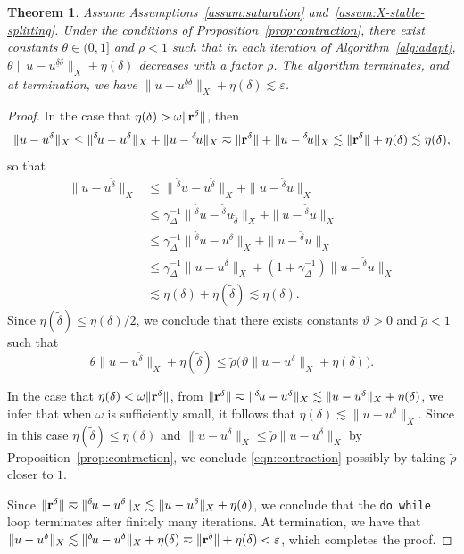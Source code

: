 \documentclass[11pt,a4paper,oneside,english]{amsart}
\numberwithin{equation}{section}
\newtheorem{theorem}{Theorem}
\numberwithin{theorem}{section}
\theoremstyle{definition}
\newcommand{\eps}{\varepsilon}
\newcommand{\udelta}{{\underline{\delta}}}
\newcommand{\jw}[1]{{\color{red}{JW: #1}}}
\begin{document}
\begin{theorem}
  Assume Assumptions~\ref{assum:saturation} and~\ref{assum:X-stable-splitting}.
  Under the conditions of Proposition~\ref{prop:contraction},
  there exist constants $\theta \in (0,1]$ and $\overline \rho < 1$ such that
  in each iteration of Algorithm~\ref{alg:adapt}, $\theta\|u - u^{\udelta \delta}\|_X + \eta(\delta)$
  decreases with a factor $\overline \rho$. The algorithm terminates, and at termination,
  we have $\|u - u^{\udelta \delta}\|_X + \eta(\delta) \lesssim \eps$.
\end{theorem}
\begin{proof}
  \jw{dit bewijs heb ik nog niet nagelopen.}
  In the case that $\eta(\delta)>\omega \|{\bf r}^\delta\|$, then
  \[
    \|u-u^\delta\|_X \leq \|{}^{\delta\!}u-u^\delta\|_X+\|u-{}^{\delta\!}u\|_X \eqsim \|{\bf r}^\delta\|+\|u-{}^{\delta\!}u\|_X \lesssim \|{\bf r}^\delta\|+\eta(\delta) \lesssim \eta(\delta),
  \]
  so that
  \begin{align*}
    \|u-u^{\tilde{\delta}}\|_X &\leq \|{}^{\tilde{\delta}\!}u-u^{\tilde{\delta}}\|_X+\|u-{}^{\tilde{\delta}\!}u\|_X\\
    &\leq \gamma_\Delta^{-1}\|{}^{\tilde{\delta}\!}u-{}^{\tilde{\delta}\!}u_{\tilde{\delta}}\|_X+\|u-{}^{\tilde{\delta}\!}u\|_X\\
    &\leq \gamma_\Delta^{-1}\|{}^{\tilde{\delta}\!}u-u^\delta\|_X+\|u-{}^{\tilde{\delta}\!}u\|_X\\
    &\leq
    \gamma_\Delta^{-1}\|u-u^\delta\|_X+(1+\gamma_\Delta^{-1})\|u-{}^{\tilde{\delta}\!}u\|_X\\
    & \lesssim \eta(\delta)+\eta(\tilde \delta) \lesssim \eta(\delta).
  \end{align*}
  Since $\eta(\tilde{\delta})\leq \eta(\delta)/2$, we conclude that there exists
  constants $\vartheta>0$ and $\breve{\rho}<1$ such that
  \begin{equation}
    \label{eqn:contraction}
    \theta \|u-u^{\tilde{\delta}}\|_X +\eta(\tilde{\delta}) \leq \breve{\rho}\big(\vartheta \|u-u^{\delta}\|_X +\eta(\delta)\big).
  \end{equation}

  In the case that $\eta(\delta)<\omega \|{\bf r}^\delta\|$, from
  $\|{\bf r}^\delta\| \eqsim \|{}^{\delta\!}u-u^\delta\|_X \lesssim \|u-u^\delta\|_X+\eta(\delta)$,
  we infer that when $\omega$ is sufficiently small, it follows that $\eta(\delta) \lesssim \|u-u^\delta\|_X$.
  Since in this case $\eta(\tilde{\delta})\leq \eta(\delta)$ and
  $\|u-u^{\tilde{\delta}}\|_X \leq \check{\rho} \|u-u^\delta\|_X$ by Proposition~\ref{prop:contraction},
  we conclude \eqref{eqn:contraction} possibly by taking $\breve{\rho}$ closer to $1$.

  Since $\|{\bf r}^\delta\| \eqsim \|{}^{\delta\!}u-u^\delta\|_X \lesssim \|u-u^\delta\|_X+\eta(\delta)$,
  we conclude that the \texttt{do while} loop terminates after finitely many iterations.
  At termination, we have that
  $\|u-u^\delta\|_X \lesssim \|{}^{\delta\!}u-u^\delta\|_X+\eta(\delta) \eqsim \|{\bf r}^\delta\|+\eta(\delta)<\eps$, which completes the proof.
\end{proof}
\end{document}
